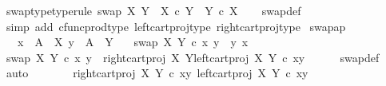 \begin{isabellebody}
\ swap{\isacharunderscore}{\kern0pt}type{\isacharbrackleft}{\kern0pt}type{\isacharunderscore}{\kern0pt}rule{\isacharbrackright}{\kern0pt}{\isacharcolon}{\kern0pt}\ {\isachardoublequoteopen}swap\ X\ Y\ {\isacharcolon}{\kern0pt}\ X\ {\isasymtimes}\isactrlsub c\ Y\ {\isasymrightarrow}\ Y\ {\isasymtimes}\isactrlsub c\ X{\isachardoublequoteclose}\isanewline
%
\isadelimproof
\ \ %
\endisadelimproof
%
\isatagproof
{}\isamarkupfalse%
\ swap{\isacharunderscore}{\kern0pt}def\ \isamarkupfalse%
\ {\isacharparenleft}{\kern0pt}simp\ add{\isacharcolon}{\kern0pt}\ cfunc{\isacharunderscore}{\kern0pt}prod{\isacharunderscore}{\kern0pt}type\ left{\isacharunderscore}{\kern0pt}cart{\isacharunderscore}{\kern0pt}proj{\isacharunderscore}{\kern0pt}type\ right{\isacharunderscore}{\kern0pt}cart{\isacharunderscore}{\kern0pt}proj{\isacharunderscore}{\kern0pt}type{\isacharparenright}{\kern0pt}%
\endisatagproof
{\isafoldproof}%
%
\isadelimproof
\isanewline
%
\endisadelimproof
\isanewline
{}\isamarkupfalse%
\ swap{\isacharunderscore}{\kern0pt}ap{\isacharcolon}{\kern0pt}\isanewline
\ \ \ {\isachardoublequoteopen}x\ {\isacharcolon}{\kern0pt}\ A\ {\isasymrightarrow}\ X{\isachardoublequoteclose}\ {\isachardoublequoteopen}y\ {\isacharcolon}{\kern0pt}\ A\ {\isasymrightarrow}\ Y{\isachardoublequoteclose}\isanewline
\ \ \ {\isachardoublequoteopen}swap\ X\ Y\ {\isasymcirc}\isactrlsub c\ {\isasymlangle}x{\isacharcomma}{\kern0pt}\ y{\isasymrangle}\ {\isacharequal}{\kern0pt}\ {\isasymlangle}y{\isacharcomma}{\kern0pt}\ x{\isasymrangle}{\isachardoublequoteclose}\isanewline
%
\isadelimproof
%
\endisadelimproof
%
\isatagproof
{}\isamarkupfalse%
\ {\isacharminus}{\kern0pt}\isanewline
\ \ \isamarkupfalse%
\ {\isachardoublequoteopen}swap\ X\ Y\ {\isasymcirc}\isactrlsub c\ {\isasymlangle}x{\isacharcomma}{\kern0pt}\ y{\isasymrangle}\ {\isacharequal}{\kern0pt}\ {\isasymlangle}right{\isacharunderscore}{\kern0pt}cart{\isacharunderscore}{\kern0pt}proj\ X\ Y{\isacharcomma}{\kern0pt}left{\isacharunderscore}{\kern0pt}cart{\isacharunderscore}{\kern0pt}proj\ X\ Y{\isasymrangle}\ {\isasymcirc}\isactrlsub c\ {\isasymlangle}x{\isacharcomma}{\kern0pt}y{\isasymrangle}{\isachardoublequoteclose}\isanewline
\ \ \ \ \isamarkupfalse%
\ swap{\isacharunderscore}{\kern0pt}def\ \isamarkupfalse%
\ auto\isanewline
\ \ \isamarkupfalse%
\ \isamarkupfalse%
\ {\isachardoublequoteopen}{\isachardot}{\kern0pt}{\isachardot}{\kern0pt}{\isachardot}{\kern0pt}\ {\isacharequal}{\kern0pt}\ {\isasymlangle}right{\isacharunderscore}{\kern0pt}cart{\isacharunderscore}{\kern0pt}proj\ X\ Y\ {\isasymcirc}\isactrlsub c\ {\isasymlangle}x{\isacharcomma}{\kern0pt}y{\isasymrangle}{\isacharcomma}{\kern0pt}\ left{\isacharunderscore}{\kern0pt}cart{\isacharunderscore}{\kern0pt}proj\ X\ Y\ {\isasymcirc}\isactrlsub c\ {\isasymlangle}x{\isacharcomma}{\kern0pt}y{\isasymrangle}{\isasymrangle}{\isachardoublequoteclose}\isanewline

\end{isabellebody}

